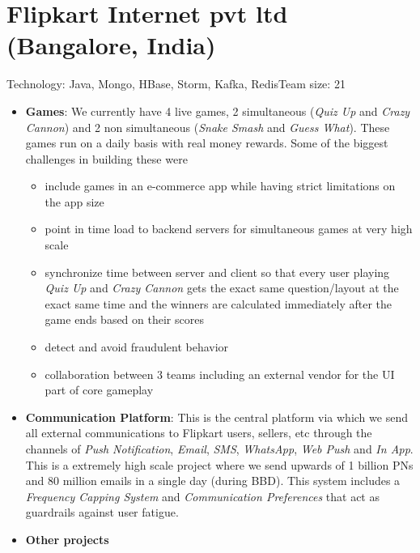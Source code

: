 \documentclass[11pt,a4paper,sans]{moderncv} %
\begin{document}
\newpage{}
\section{Flipkart Internet pvt ltd (Bangalore, India)}
         {Technology: Java, Mongo, HBase, Storm, Kafka, Redis}{Team size: 21}
         {\begin{itemize}
            \item \textbf{Games}: We currently have 4 live games, 2 simultaneous (\textit{Quiz Up} and \textit{Crazy Cannon}) and 2 non simultaneous (\textit{Snake Smash} and \textit{Guess What}). These games run on a daily basis with real money rewards. Some of the biggest challenges in building these were
              \begin{itemize}
                \item include games in an e-commerce app while having strict limitations on the app size
                \item point in time load to backend servers for simultaneous games at very high scale
                \item synchronize time between server and client so that every user playing \textit{Quiz Up} and \textit{Crazy Cannon} gets the exact same question/layout at the exact same time and the winners are calculated immediately after the game ends based on their scores
                \item detect and avoid fraudulent behavior
                \item collaboration between 3 teams including an external vendor for the UI part of core gameplay
              \end{itemize}
            \item \textbf{Communication Platform}: This is the central platform via which we send all external communications to Flipkart users, sellers, etc through the channels of \textit{Push Notification}, \textit{Email},  \textit{SMS}, \textit{WhatsApp}, \textit{Web Push} and \textit{In App}. This is a extremely high scale project where we send upwards of 1 billion PNs and 80 million emails in a single day (during BBD). This system includes a \textit{Frequency Capping System} and \textit{Communication Preferences} that act as guardrails against user fatigue.
            \item \textbf{Other projects}

\end{itemize}}
\end{document}
